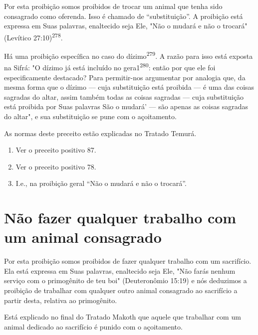 Por esta proibição somos proibidos de trocar um animal que tenha sido
consagrado como oferenda. Isso é chamado de ``substituição''. A proibi­ção
está expressa em Suas palavras, enaltecido seja Ele, "Não o mudará e não
o trocará" (Levítico 27:10)\textsuperscript{278}.

Há uma proibição específica no caso do dízimo\textsuperscript{279}. A
razão para is­so está exposta na Sifrá: "O dízimo já está incluído no
gera1\textsuperscript{280}: então por que ele foi especificamente
destacado? Para permitir-nos argumentar por analogia que, da mesma forma
que o dízimo --- cuja substituição está proibida --- é uma das coisas
sagradas do altar, assim também todas as coisas sagradas --- cuja
subs­tituição está proibida por Suas palavras São o mudará' --- são
apenas as coisas sagradas do altar", e sua substituição se pune com o
açoitamento.

As normas deste preceito estão explicadas no Tratado Temurá.


\begin{enumerate}
\def\labelenumi{\arabic{enumi}.}
\setcounter{enumi}{277}
\item
 
 Ver o preceito positivo 87.
 
\item
 
 Ver o preceito positivo 78.
 
\item
 
 I.e., na proibição geral ``Não o mudará e não o trocará''.
 
\end{enumerate}



\section{Não fazer qualquer trabalho com um animal consagrado}

Por esta proibição somos proibidos de fazer qualquer trabalho com um
sacrifício. Ela está expressa em Suas palavras, enaltecido seja Ele,
"Não fa­rás nenhum serviço com o primogênito de teu boi" (Deuteronômio
15:19) e nós deduzimos a proibição de trabalhar com qualquer outro
animal consagra­do ao sacrifício a partir desta, relativa ao
primogênito.

Está explicado no final do Tratado Makoth que aquele que trabalhar com
um animal dedicado ao sacrifício é punido com o açoitamento.

